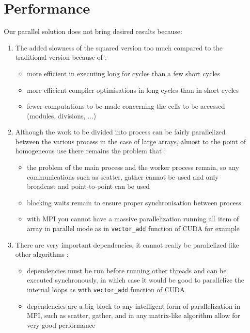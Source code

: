 \section{Performance}\label{performance}

Our parallel solution does not bring desired results because:
\begin{enumerate}
    \item \label{overhead-squared} The added slowness of the squared version too much compared to the traditional version because of \cite{rucci}: 
    \begin{itemize}
        \item more efficient in executing long for cycles than a few short cycles
        \item more efficient compiler optimisations in long cycles than in short cycles
        \item fewer computations to be made concerning the cells to be accessed (modules, divisions, ...)
    \end{itemize}
    \item \label{overhead-mpi} Although the work to be divided into process can be fairly parallelized between the various process in the case of large arrays, almost to the point of homogeneous use there remains the problem that \cite{koallen}:
    \begin{itemize}
        \item the problem of the main process and the worker process remain, so any communications such as scatter, gather cannot be used and only broadcast and point-to-point can be used
        \item blocking waits remain to ensure proper synchronisation between process
        \item with MPI you cannot have a massive parallelization running all item of array in parallel mode  as in  \texttt{vector_add} function of CUDA for example
    \end{itemize}
    \item \label{overhead-dependencies} There are very important dependencies, it cannot really be parallelized like other algorithms \cite{rucci}:
    \begin{itemize}
        \item dependencies must be run before running other threads and can be executed synchronously, in which case it would be good to parallelize the internal loops as with  \texttt{vector_add} function of CUDA
        \item dependencies are a big block to any intelligent form of parallelization in MPI, such as scatter, gather, and in any matrix-like algorithm allow for very good performance

\end{itemize}
\end{enumerate}
